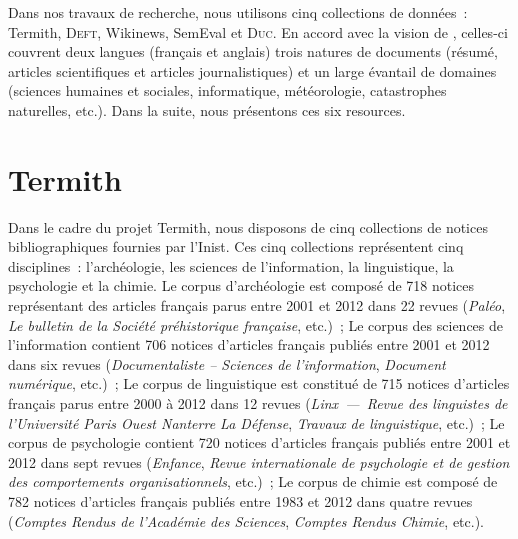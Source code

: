     Dans nos travaux de recherche, nous utilisons cinq collections de données~:
    Termith, \textsc{Deft}, Wikinews, SemEval et \textsc{Duc}. En accord avec la
    vision de , celles-ci couvrent deux langues
    (français et anglais) trois natures de documents (résumé, articles
    scientifiques et articles journalistiques) et un large évantail de domaines
    (sciences humaines et sociales, informatique, météorologie, catastrophes
    naturelles, etc.). Dans la suite, nous présentons ces six resources.


  \section{Termith}
  \label{sec:main-data_description-termith_data}
    Dans le cadre du projet Termith, nous disposons de cinq collections de
    notices bibliographiques fournies par l'Inist. Ces cinq collections
    représentent cinq disciplines~: l'archéologie, les sciences de
    l'information, la linguistique, la psychologie et la chimie. Le corpus
    d'archéologie est composé de 718 notices représentant des articles français
    parus entre 2001 et 2012 dans 22 revues (\textit{Paléo}, \textit{Le bulletin
    de la Société préhistorique française}, etc.)~; Le corpus des sciences de
    l'information contient 706 notices d'articles français publiés entre 2001 et
    2012 dans six revues (\textit{Documentaliste -- Sciences de l'information},
    \textit{Document numérique}, etc.)~; Le corpus de linguistique est constitué
    de 715 notices d'articles français parus entre 2000 à 2012 dans 12 revues
    (\textit{Linx~---~Revue des linguistes de l'Université Paris Ouest Nanterre
    La Défense}, \textit{Travaux de linguistique}, etc.)~; Le corpus de
    psychologie contient 720 notices d'articles français publiés entre 2001 et
    2012 dans sept revues (\textit{Enfance}, \textit{Revue internationale de
    psychologie et de gestion des comportements organisationnels}, etc.)~; Le
    corpus de chimie est composé de 782 notices d'articles français publiés
    entre 1983 et 2012 dans quatre revues (\textit{Comptes Rendus de l'Académie
    des Sciences}, \textit{Comptes Rendus Chimie}, etc.).
    
